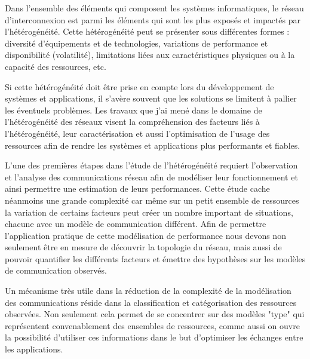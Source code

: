 \begin{resume}
Dans l'ensemble des éléments qui composent les systèmes informatiques, le réseau d'interconnexion est parmi les éléments qui sont les plus exposés et impactés par l'hétérogénéité. Cette hétérogénéité peut se présenter sous différentes formes : diversité d'équipements et de technologies, variations de performance et disponibilité (volatilité), limitations liées aux caractéristiques physiques ou à la capacité des ressources, etc. 

Si cette hétérogénéité doit être prise en compte lors du développement de systèmes et applications, il s'avère souvent que les solutions se limitent à pallier les éventuels problèmes. Les travaux que j'ai mené dans le domaine de l'hétérogénéité des réseaux visent la compréhension des facteurs liés à l'hétérogénéité, leur caractérisation et aussi l'optimisation de l'usage des ressources afin de rendre les systèmes et applications plus performants et fiables.

L'une des premières étapes dans l'étude de l'hétérogénéité requiert l'observation et l'analyse des communications réseau afin de modéliser leur fonctionnement et ainsi permettre une estimation de leurs performances. Cette étude cache néanmoins une grande complexité car même sur un petit ensemble de ressources la variation de certains facteurs peut créer un nombre important de situations, chacune avec un modèle de communication différent. Afin de permettre l'application pratique de cette modélisation de performance nous devons non seulement être en mesure de découvrir la topologie du réseau, mais aussi de pouvoir quantifier les différents facteurs et émettre des hypothèses sur les modèles de communication observés. 

Un mécanisme très utile dans la réduction de la complexité de la modélisation des communications réside dans la classification et catégorisation des ressources observées. Non seulement cela permet de se concentrer sur des modèles "type" qui représentent convenablement des ensembles de ressources, comme aussi on ouvre la possibilité d'utiliser ces informations dans le but d'optimiser les échanges entre les applications.


\end{resume}
